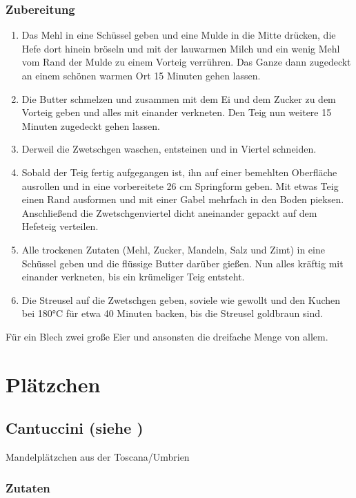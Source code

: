 \subsection*{Zubereitung}
\begin{enumerate}
	\item Das Mehl in eine Schüssel geben und eine Mulde in die Mitte drücken, die Hefe dort hinein bröseln und mit der lauwarmen Milch und ein wenig Mehl vom Rand der Mulde zu einem Vorteig verrühren. Das Ganze dann zugedeckt an einem schönen warmen Ort 15 Minuten gehen lassen.
	\item Die Butter schmelzen und zusammen mit dem Ei und dem Zucker zu dem Vorteig geben und alles mit einander verkneten. Den Teig nun weitere 15 Minuten zugedeckt gehen lassen.
	\item Derweil die Zwetschgen waschen, entsteinen und in Viertel schneiden.
	\item Sobald der Teig fertig aufgegangen ist, ihn auf einer bemehlten Oberfläche ausrollen und in eine vorbereitete 26 cm Springform geben. Mit etwas Teig einen Rand ausformen und mit einer Gabel mehrfach in den Boden pieksen. Anschließend die Zwetschgenviertel dicht aneinander gepackt auf dem Hefeteig verteilen.
	\item Alle trockenen Zutaten (Mehl, Zucker, Mandeln, Salz und Zimt) in eine Schüssel geben und die flüssige Butter darüber gießen. Nun alles kräftig mit einander verkneten, bis ein krümeliger Teig entsteht.
	\item Die Streusel auf die Zwetschgen geben, soviele wie gewollt und den Kuchen bei 180°C für etwa 40 Minuten backen, bis die Streusel goldbraun sind.
\end{enumerate}

Für ein Blech zwei große Eier und ansonsten die dreifache Menge von allem.



\chapter{Plätzchen}

\section[Cantuccini]{Cantuccini \textmd{(siehe \cite{ChefkochCantuccini})}}
Mandelplätzchen aus der Toscana/Umbrien
\subsection*{Zutaten}

